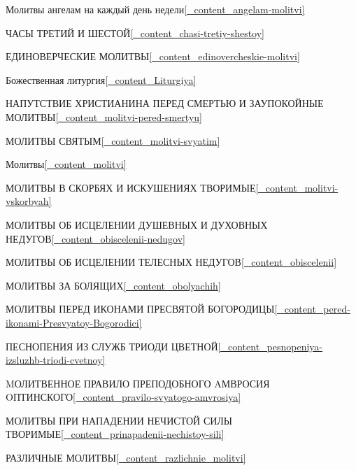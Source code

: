 \Large Молитвы ангелам на каждый день недели\hfill\ref{_content_angelam-molitvi}

\medskip

\Large ЧАСЫ ТРЕТИЙ И ШЕСТОЙ\hfill\ref{_content_chasi-tretiy-shestoy}

\medskip

\Large ЕДИНОВЕРЧЕСКИЕ МОЛИТВЫ\hfill\ref{_content_edinovercheskie-molitvi}

\medskip

\Large Божественная литургия\hfill\ref{_content_Liturgiya}

\medskip

\Large НАПУТСТВИЕ ХРИСТИАНИНА ПЕРЕД СМЕРТЬЮ И ЗАУПОКОЙНЫЕ МОЛИТВЫ\hfill\ref{_content_molitvi-pered-smertyu}

\medskip

\Large МОЛИТВЫ СВЯТЫМ\hfill\ref{_content_molitvi-svyatim}

\medskip

\Large Молитвы\hfill\ref{_content_molitvi}

\medskip

\Large МОЛИТВЫ В СКОРБЯХ И ИСКУШЕНИЯХ ТВОРИМЫЕ\hfill\ref{_content_molitvi-vskorbyah}

\medskip

\Large МОЛИТВЫ ОБ ИСЦЕЛЕНИИ ДУШЕВНЫХ И ДУХОВНЫХ НЕДУГОВ\hfill\ref{_content_obiscelenii-nedugov}

\medskip

\Large МОЛИТВЫ ОБ ИСЦЕЛЕНИИ ТЕЛЕСНЫХ НЕДУГОВ\hfill\ref{_content_obiscelenii}

\medskip

\Large МОЛИТВЫ ЗА БОЛЯЩИХ\hfill\ref{_content_obolyachih}

\medskip

\Large МОЛИТВЫ ПЕРЕД ИКОНАМИ ПРЕСВЯТОЙ БОГОРОДИЦЫ\hfill\ref{_content_pered-ikonami-Presvyatoy-Bogorodici}

\medskip

\Large ПЕСНОПЕНИЯ ИЗ СЛУЖБ ТРИОДИ ЦВЕТНОЙ\hfill\ref{_content_pesnopeniya-izsluzhb-triodi-cvetnoy}

\medskip

\Large MОЛИТВЕННОЕ ПРАВИЛО ПРЕПОДОБНОГО AМВРОСИЯ OПТИНСКОГО\hfill\ref{_content_pravilo-svyatogo-amvrosiya}

\medskip

\Large МОЛИТВЫ ПРИ НАПАДЕНИИ НЕЧИСТОЙ СИЛЫ ТВОРИМЫЕ\hfill\ref{_content_prinapadenii-nechistoy-sili}

\medskip

\Large РАЗЛИЧНЫЕ МОЛИТВЫ\hfill\ref{_content_razlichnie_molitvi}

